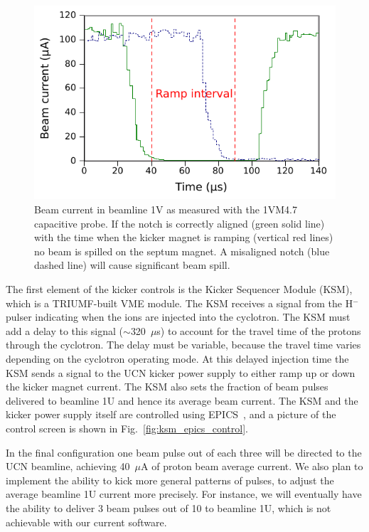 \documentclass[aps,prab,twocolumn,superscriptaddress]{revtex4-1}
\begin{document}
\begin{figure}
    \centering
    \includegraphics[width=\linewidth]{1VM4_alignment.pdf}
    \caption{Beam current in beamline 1V as measured with the 1VM4.7 capacitive probe. If the notch is correctly aligned (green solid line) with the time when the kicker magnet is ramping (vertical red lines) no beam is spilled on the septum magnet. A misaligned notch (blue dashed line) will cause significant beam spill.}
    \label{fig:ktm_plots}
\end{figure}

The first element of the kicker controls is the Kicker Sequencer Module (KSM), which is a TRIUMF-built VME module.  The KSM receives a signal from the H$^{-}$ pulser indicating when the ions are injected into the cyclotron. The KSM must add a delay to this signal ($\sim$320~$\mu$s) to account for the travel time of the protons through the cyclotron. The delay must be variable, because the travel time varies depending on the cyclotron operating mode.  At this delayed injection time the KSM sends a signal to the UCN kicker power supply to either ramp up or down the kicker magnet current.  The KSM also sets the fraction of beam pulses delivered to beamline 1U and hence its average beam current.  The KSM and the kicker power supply itself are controlled using EPICS~\cite{bib:epics}, and a picture of the control screen is shown in Fig.~\ref{fig:ksm_epics_control}.

In the final configuration one beam pulse out of each three will be directed to the UCN beamline, achieving 40~$\mu$A of proton beam average current.  We also plan to implement the ability to kick more general patterns of pulses, to adjust the average beamline 1U current more precisely.  For instance, we will eventually have the ability to deliver 3 beam pulses out of 10 to beamline 1U, which is not achievable with our current software.
  
\end{document}
